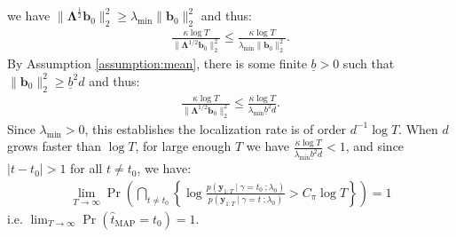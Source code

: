 we have $\lVert\boldsymbol{\Lambda}^{\frac{1}{2}} \mathbf{b}_0\rVert^2_2 \geq \lambda_{\min} \lVert \mathbf{b}_0\rVert^2_2$ and thus:
\begin{align*}
    \frac{\kappa \log T}{\lVert \boldsymbol{\Lambda}^{1/2}\mathbf{b}_0\rVert_2^2} \leq 
    \frac{\kappa \log T}{\lambda_{\min}\lVert\mathbf{b}_0\rVert_2^2}. 
\end{align*}
By Assumption \ref{assumption:mean}, there is some finite $\underline{b} > 0$ such that $\lVert\mathbf{b}_0\rVert_2^2 \geq \underline{b}^2 d$ and thus:
\begin{align*}
    \frac{\kappa \log T}{\lVert \boldsymbol{\Lambda}^{1/2}\mathbf{b}_0\rVert_2^2} \leq 
    \frac{\kappa \log T}{\lambda_{\min}\underline{b}^2 d}. 
\end{align*}
Since $\lambda_{\min} > 0$, this establishes the localization rate is of order $d^{-1} \log T$. When $d$ grows faster than $\log T$, for large enough $T$ we have $\frac{\kappa \log T}{\lambda_{\min}\underline{b}^2 d} < 1$, and since $|t - t_0| > 1$ for all $t\neq t_0$, we have:
\begin{align*}
    \lim_{T\to\infty}\Pr\left(\bigcap_{t \neq t_0}\left\{ \log \frac{p(\mathbf{y}_{1:T} \:|\:\gamma = t_0 \:; \lambda_0)}{p(\mathbf{y}_{1:T} \:|\:\gamma = t \:; \lambda_0)} > C_\pi \log T\right\}\right) = 1
\end{align*}
i.e. $\lim_{T\to\infty}\Pr(\hat{t}_{\text{MAP}} = t_0) = 1$.

